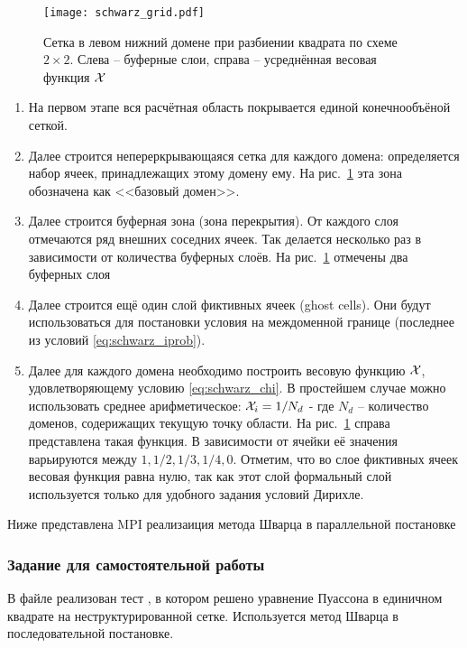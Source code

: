 \begin{figure}[h!]
\centering
\texttt{[image: schwarz\_grid.pdf]}
\caption{Сетка в левом нижний домене при разбиении квадрата по схеме $2\times2$. Слева -- буферные слои, справа -- усреднённая весовая функция $\mathcal{X}$}
\label{fig:schwarz_grid}
\end{figure}

\begin{enumerate}
\item На первом этапе вся расчётная область покрывается единой конечнообъёной сеткой.
\item Далее строится непереркрывающаяся сетка для каждого домена: определяется набор ячеек, принадлежащих этому домену ему. На рис.~\ref{fig:schwarz_grid}
эта зона обозначена как <<базовый домен>>.
\item Далее строится буферная зона (зона перекрытия). От каждого слоя отмечаются ряд внешних соседних ячеек. Так делается несколько раз в зависимости от количества буферных слоёв.
      На рис.~\ref{fig:schwarz_grid} отмечены два буферных слоя
\item Далее строится ещё один слой фиктивных ячеек (ghost cells). Они будут использоваться для постановки условия
      на междоменной границе (последнее из условий \cref{eq:schwarz_iprob}).
\item Далее для каждого домена необходимо построить весовую функцию $\mathcal{X}$, удовлетворяющему условию \cref{eq:schwarz_chi}.
      В простейшем случае можно использовать среднее арифметическое: $\mathcal{X}_i = 1/N_d$ - где $N_d$ -- количество доменов, содерижащих текущую точку области.
      На рис.~\ref{fig:schwarz_grid} справа представлена такая функция. В зависимости от ячейки её значения варьируются между $1, 1/2, 1/3, 1/4, 0$.
      Отметим, что во слое фиктивных ячеек весовая функция равна нулю, так как этот слой формальный слой используется только для удобного задания условий Дирихле.
\end{enumerate}

Ниже представлена MPI реализаиция метода Шварца в параллельной постановке


\subsubsection{Задание для самостоятельной работы}
В файле 
реализован тест ,
в котором решено уравнение Пуассона в единичном квадрате на неструктурированной сетке.
Используется метод Шварца в последовательной постановке.

